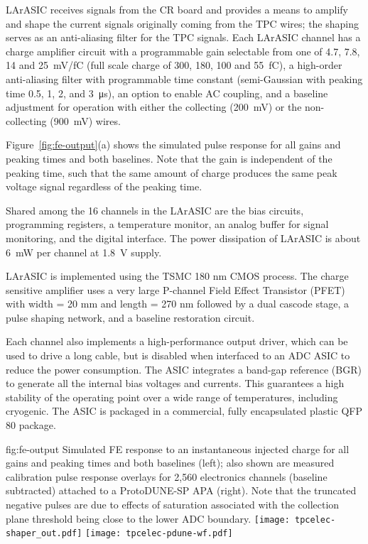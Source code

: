 LArASIC receives signals from the CR board and
provides a means to amplify and shape the current signals originally coming from the TPC wires; the
shaping serves as an anti-aliasing filter for the TPC signals.
Each LArASIC channel has a charge amplifier circuit with a programmable
gain selectable from one of 4.7, 7.8, 14 and 25~mV/fC
(full scale charge of 300, 180, 100 and 55~fC),
a high-order anti-aliasing filter with programmable time
constant (semi-Gaussian with peaking time 0.5, 1, 2, and 3~\si{\micro\second}),
an option to enable AC coupling,
and a baseline adjustment for operation with either the collecting (200~mV) or the non-collecting (900~mV) wires.

Figure~\ref{fig:fe-output}(a) shows the simulated pulse response for all gains and peaking times and both baselines.
Note that the gain is independent of the peaking time, such that the same amount of charge produces the same peak voltage signal regardless of the peaking time.  

Shared among the 16 channels in the LArASIC are the bias circuits, programming registers,
a temperature monitor, an analog buffer for signal monitoring, and the digital interface.
The power dissipation of LArASIC is about 6~mW per channel at 1.8~V supply.

LArASIC is implemented using the TSMC 180 nm CMOS process.  The charge sensitive amplifier uses a very large P-channel Field Effect Transistor (PFET) with width = 20 mm and length = 270 nm followed by a dual cascode stage, a pulse shaping network, and a baseline restoration circuit.  

Each channel also implements a high-performance output driver,
which can be used to drive a long cable, but is disabled when interfaced to an ADC ASIC to reduce the power consumption.
The ASIC integrates a band-gap reference (BGR) to generate all the internal bias voltages and currents.
This guarantees a high stability of the operating point over a wide range of
temperatures, including cryogenic.
The ASIC is packaged in a commercial, fully encapsulated plastic QFP 80 package.

\begin{dunefigure}
{fig:fe-output}
{Simulated FE response to an instantaneous injected charge for all gains and peaking times and both baselines (left); also shown are measured calibration pulse response overlays for 2,560 electronics channels (baseline subtracted) attached to a ProtoDUNE-SP APA (right).  Note that the truncated negative pulses are due to effects of saturation associated with the collection plane threshold being close to the lower ADC boundary.}
\texttt{[image: tpcelec-shaper\_out.pdf]}
\texttt{[image: tpcelec-pdune-wf.pdf]}
\end{dunefigure}

